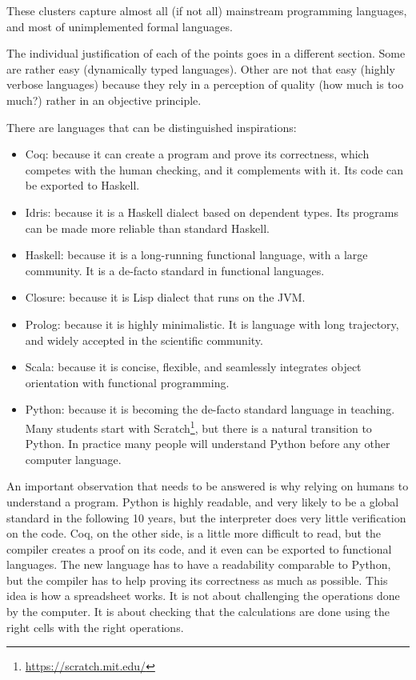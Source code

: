 {    These clusters capture almost all (if not all) mainstream programming languages, and most of unimplemented formal languages.

    The individual justification of each of the points goes in a different section.
    Some are rather easy (dynamically typed languages). Other are not that easy (highly verbose languages) because they rely in a perception of quality (how much is too much?) rather in an objective principle.

    There are languages that can be distinguished inspirations:
    \begin{itemize}
        \item Coq: because it can create a program and prove its correctness, which competes with the human checking, and it complements with it.
        Its code can be exported to Haskell.
        \item Idris: because it is a Haskell dialect based on dependent types.
        Its programs can be made more reliable than standard Haskell.
        \item Haskell: because it is a long-running functional language, with a large community.
        It is a de-facto standard in functional languages.
        \item Closure: because it is Lisp dialect that runs on the JVM.
        \item Prolog: because it is highly minimalistic.
        It is language with long trajectory, and widely accepted in the scientific community.
        \item Scala: because it is concise, flexible, and seamlessly integrates object orientation with functional programming.
        \item Python: because it is becoming the de-facto standard language in teaching.
        Many students start with Scratch\footnote{\url{https://scratch.mit.edu/}}, but there is a natural transition to Python. In practice many people will understand Python before any other computer language.
    \end{itemize}

    An important observation that needs to be answered is why relying on humans to understand a program.
    Python is highly readable, and very likely to be a global standard in the following 10 years, but the interpreter does very little verification on the code.
    Coq, on the other side, is a little more difficult to read, but the compiler creates a proof on its code, and it even can be exported to functional languages.
    The new language has to have a readability comparable to Python, but the compiler has to help proving its correctness as much as possible.
    This idea is how a spreadsheet works.
    It is not about challenging the operations done by the computer.
    It is about checking that the calculations are done using the right cells with the right operations.
}

